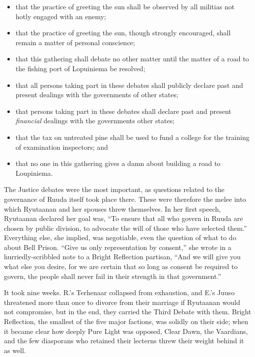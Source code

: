 \documentclass[12pt]{report}
\begin{document}
\begin{itemize}
\item that the practice of greeting the sun shall be observed by all
militias not hotly engaged with an enemy;

\item that the practice of greeting the sun, though strongly
encouraged, shall remain a matter of personal conscience;

\item that this gathering shall debate no other matter until the
matter of a road to the fishing port of Lopuiniema be resolved;

\item that all persons taking part in these debates shall publicly
declare past and present dealings with the governments of other
states;

\item that persons taking part in these debates shall declare past and
present \emph{financial} dealings with the governments other states;

\item that the tax on untreated pine shall be used to fund a college
for the training of examination inspectors; and

\item that no one in this gathering gives a damn about building a road
to Loupiniema.

\end{itemize}

The Justice debates were the most important, as questions related to
the governance of Ruuda itself took place there.  These were therefore
the melee into which Ryutaanan and her spouses threw themselves.  In
her first speech, Ryutaanan declared her goal was, ``To ensure that all
who govern in Ruuda are chosen by public division, to advocate the
will of those who have selected them.''  Everything else, she implied,
was negotiable, even the question of what to do about Bell Prison.
``Give us only representation by consent,'' she wrote in a
hurriedly-scribbled note to a Bright Reflection partisan, ``And we will
give you what else you desire, for we are certain that so long as
consent be required to govern, the people shall never fail in their
strength in that government.''

It took nine weeks.  R.'s Terhenaar collapsed from exhaustion, and
E.'s Juuso threatened more than once to divorce from their marriage if
Ryutaanan would not compromise, but in the end, they carried the Third
Debate with them.  Bright Reflection, the smallest of the five major
factions, was solidly on their side; when it became clear how deeply
Pure Light was opposed, Clear Dawn, the Vaardians, and the few
diasporans who retained their lecterns threw their weight behind it as
well.
\end{document}
